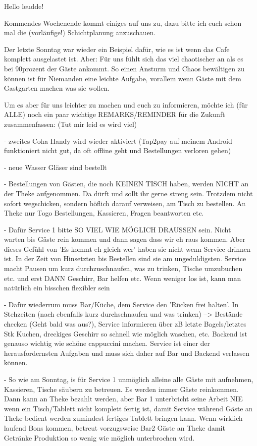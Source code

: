 Hello leudde!

Kommendes Wochenende kommt einiges auf uns zu, dazu bitte ich euch schon mal die (vorläufige!) Schichtplanung anzuschauen.

Der letzte Sonntag war wieder ein Beispiel dafür, wie es ist wenn das Cafe komplett ausgelastet ist. 
Aber: Für uns fühlt sich das viel chaotischer an als es bei 90prozent der Gäste ankommt.
So einen Ansturm und Chaos bewältigen zu können ist für Niemanden eine leichte Aufgabe, vorallem wenn Gäste mit dem Gastgarten machen was sie wollen.

Um es aber für uns leichter zu machen und euch zu informieren, möchte ich (für ALLE) noch ein paar wichtige REMARKS/REMINDER für die Zukunft zusammenfassen: 
(Tut mir leid es wird viel)

- zweites Coha Handy wird wieder aktiviert
    (Tap2pay auf meinem Android funktioniert nicht gut, da oft offline geht und Bestellungen verloren gehen)

- neue Wasser Gläser sind bestellt
    
- Bestellungen von Gästen, die noch KEINEN TISCH haben, werden NICHT an der Theke aufgenommen.
    Da dürft und sollt ihr gerne streng sein. Trotzdem nicht sofort wegschicken, sondern höflich darauf verweisen, am Tisch zu bestellen.
    An Theke nur Togo Bestellungen, Kassieren, Fragen beantworten etc.

- Dafür Service 1 bitte SO VIEL WIE MÖGLICH DRAUSSEN sein. Nicht warten bis Gäste rein kommen und dann sagen dass wir eh raus kommen.
    Aber dieses Gefühl von 'Es kommt eh gleich wer' haben sie nicht wenn Service drinnen ist.
    In der Zeit von Hinsetzten bis Bestellen sind sie am ungeduldigsten.
    Service macht Pausen um kurz durchzuschnaufen, was zu trinken, Tische umzubuchen etc. und erst DANN Geschirr, Bar helfen etc.
    Wenn weniger los ist, kann man natürlich ein bisschen flexibler sein

- Dafür wiederrum muss Bar/Küche, dem Service den 'Rücken frei halten'. In Stehzeiten (nach ebenfalls kurz durchschnaufen und was trinken)
    --> Bestände checken (Geht bald was aus?), Service informieren über zB letzte Bagels/letztes Stk Kuchen, dreckiges Geschirr so schnell wie möglich waschen, etc.
    Backend ist genauso wichtig wie schöne cappuccini machen.
    Service ist einer der herausfordernsten Aufgaben und muss sich daher auf Bar und Backend verlassen können.

- So wie am Sonntag, is für Service 1 unmöglich alleine alle Gäste mit aufnehmen, Kassieren, Tische säubern zu betreuen. Es werden immer Gäste reinkommen.
    Dann kann an Theke bezahlt werden, aber Bar 1 unterbricht seine Arbeit NIE wenn ein Tisch/Tablett nicht komplett fertig ist, damit Service während Gäste an Theke bedient werden zumindest fertiges Tablett bringen kann. 
    Wenn wirklich laufend Bons kommen, betreut vorzugsweise Bar2 Gäste an Theke damit Getränke Produktion so wenig wie möglich unterbrochen wird.

